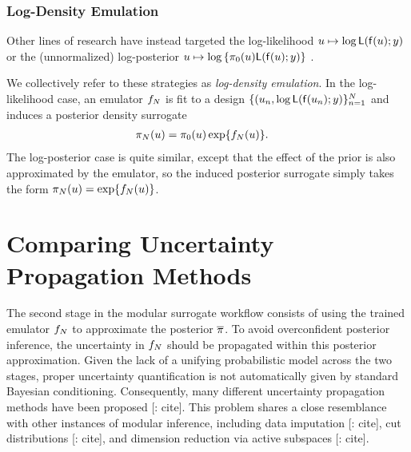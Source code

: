 \documentclass[12pt]{article}
\begin{document}
\subsubsection{Log-Density Emulation}
Other lines of research have instead targeted the log-likelihood $u \mapsto \log \mathsf{L}(\mathsf{f}(u); y)$
\citep{VehtariParallelGP,FATES_CES,trainDynamics,quantileApprox,
ActiveLearningMCMC,FerEmulation,StuartTeck1,random_fwd_models,
GP_PDE_priors,OakleyllikEm,JosephMinEnergy,AlawiehIterativeGP}
or the (unnormalized) log-posterior 
$u \mapsto \log \left\{\pi_0(u)\mathsf{L}(\mathsf{f}(u); y)\right\}$
\citep{emPostDens,Kandasamy_2017,llikRBF,gp_surrogates_random_exploration,
landslideCalibration}.

We collectively refer to these strategies as \textit{log-density emulation}. In the 
log-likelihood case, an emulator $f_{N}$ is fit to a design 
$\{(u_n, \log \mathsf{L}(\mathsf{f}(u_n); y)\}_{n=1}^{N}$
and induces a posterior density surrogate 
\begin{align}
\pi_{N}(u) &= \pi_0(u) \exp\mathopen{}\left\{f_{N}(u)\right\}\mathclose{}. \label{eq:post-em-llik}
\end{align}
The log-posterior case is quite similar, except that the effect of the prior is also 
approximated by the emulator, so the induced posterior surrogate simply takes 
the form $\pi_{N}(u) = \exp\mathopen{}\left\{f_{N}(u)\right\}\mathclose{}$.

\section{Comparing Uncertainty Propagation Methods} \label{sec:compare-unc-prop}
The second stage in the modular surrogate workflow consists of using the 
trained emulator $f_{N}$ to approximate the posterior $\overline{\pi}$.
To avoid overconfident posterior inference, the uncertainty in $f_{N}$
should be propagated within this posterior approximation. Given the lack of
a unifying probabilistic model across the two stages, proper uncertainty 
quantification is not automatically given by standard Bayesian conditioning.
Consequently, many different uncertainty propagation methods have been 
proposed [\todo: cite]. This problem shares a close resemblance with other 
instances of modular inference, including data imputation [\todo: cite],
cut distributions [\todo: cite], and dimension reduction via active subspaces [\todo: cite].
\end{document}

